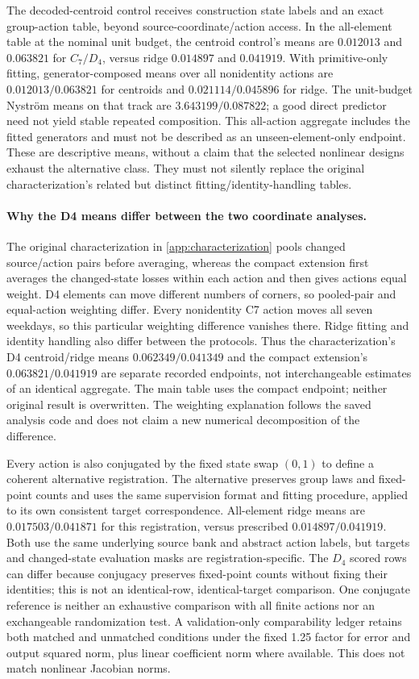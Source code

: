 The decoded-centroid control receives construction state labels and an exact group-action table, beyond source-coordinate/action access. In the all-element table at the nominal unit budget, the centroid control's means are $0.012013$ and $0.063821$ for $C_7/D_4$, versus ridge $0.014897$ and $0.041919$. With primitive-only fitting, generator-composed means over all nonidentity actions are $0.012013/0.063821$ for centroids and $0.021114/0.045896$ for ridge. The unit-budget Nystr\"om means on that track are $3.643199/0.087822$; a good direct predictor need not yield stable repeated composition. This all-action aggregate includes the fitted generators and must not be described as an unseen-element-only endpoint. These are descriptive means, without a claim that the selected nonlinear designs exhaust the alternative class. They must not silently replace the original characterization's related but distinct fitting/identity-handling tables.

\paragraph{Why the D4 means differ between the two coordinate analyses.}
\label{app:aggregation-contract}
The original characterization in \cref{app:characterization} pools changed source/action pairs before averaging, whereas the compact extension first averages the changed-state losses within each action and then gives actions equal weight. D4 elements can move different numbers of corners, so pooled-pair and equal-action weighting differ. Every nonidentity C7 action moves all seven weekdays, so this particular weighting difference vanishes there. Ridge fitting and identity handling also differ between the protocols. Thus the characterization's D4 centroid/ridge means $0.062349/0.041349$ and the compact extension's $0.063821/0.041919$ are separate recorded endpoints, not interchangeable estimates of an identical aggregate. The main table uses the compact endpoint; neither original result is overwritten. The weighting explanation follows the saved analysis code and does not claim a new numerical decomposition of the difference.

Every action is also conjugated by the fixed state swap $(0,1)$ to define a coherent alternative registration. The alternative preserves group laws and fixed-point counts and uses the same supervision format and fitting procedure, applied to its own consistent target correspondence. All-element ridge means are $0.017503/0.041871$ for this registration, versus prescribed $0.014897/0.041919$. Both use the same underlying source bank and abstract action labels, but targets and changed-state evaluation masks are registration-specific. The $D_4$ scored rows can differ because conjugacy preserves fixed-point counts without fixing their identities; this is not an identical-row, identical-target comparison. One conjugate reference is neither an exhaustive comparison with all finite actions nor an exchangeable randomization test. A validation-only comparability ledger retains both matched and unmatched conditions under the fixed 1.25 factor for error and output squared norm, plus linear coefficient norm where available. This does not match nonlinear Jacobian norms.

